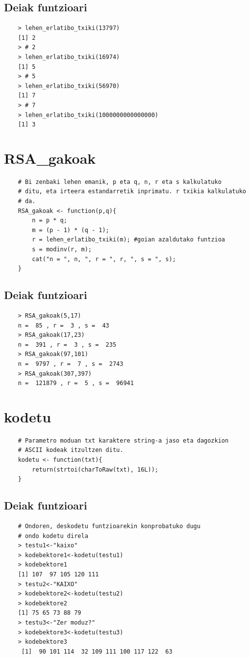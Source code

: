 \documentclass[12pt]{basque-book}
\begin{document}
\subsection{Deiak funtzioari}
\begin{verbatim}
    > lehen_erlatibo_txiki(13797)
    [1] 2
    > # 2
    > lehen_erlatibo_txiki(16974)
    [1] 5
    > # 5
    > lehen_erlatibo_txiki(56970)
    [1] 7
    > # 7
    > lehen_erlatibo_txiki(1000000000000000)
    [1] 3
\end{verbatim}
    
\newpage

\section{RSA\_gakoak}
\begin{verbatim}
    # Bi zenbaki lehen emanik, p eta q, n, r eta s kalkulatuko 
    # ditu, eta irteera estandarretik inprimatu. r txikia kalkulatuko
    # da.
    RSA_gakoak <- function(p,q){
        n = p * q;
        m = (p - 1) * (q - 1);
        r = lehen_erlatibo_txiki(m); #goian azaldutako funtzioa
        s = modinv(r, m);
        cat("n = ", n, ", r = ", r, ", s = ", s); 
    }
\end{verbatim}
\subsection{Deiak funtzioari}
\begin{verbatim}
    > RSA_gakoak(5,17)
    n =  85 , r =  3 , s =  43
    > RSA_gakoak(17,23)
    n =  391 , r =  3 , s =  235
    > RSA_gakoak(97,101)
    n =  9797 , r =  7 , s =  2743
    > RSA_gakoak(307,397)
    n =  121879 , r =  5 , s =  96941
\end{verbatim}

\newpage

\section{kodetu}
\begin{verbatim}
    # Parametro moduan txt karaktere string-a jaso eta dagozkion  
    # ASCII kodeak itzultzen ditu.
    kodetu <- function(txt){
        return(strtoi(charToRaw(txt), 16L));
    }
\end{verbatim}

\subsection{Deiak funtzioari}
\begin{verbatim}
    # Ondoren, deskodetu funtzioarekin konprobatuko dugu  
    # ondo kodetu direla
    > testu1<-"kaixo"
    > kodebektore1<-kodetu(testu1)
    > kodebektore1
    [1] 107  97 105 120 111
    > testu2<-"KAIXO"
    > kodebektore2<-kodetu(testu2)
    > kodebektore2
    [1] 75 65 73 88 79
    > testu3<-"Zer moduz?"
    > kodebektore3<-kodetu(testu3)
    > kodebektore3
     [1]  90 101 114  32 109 111 100 117 122  63
\end{verbatim}
\end{document}
